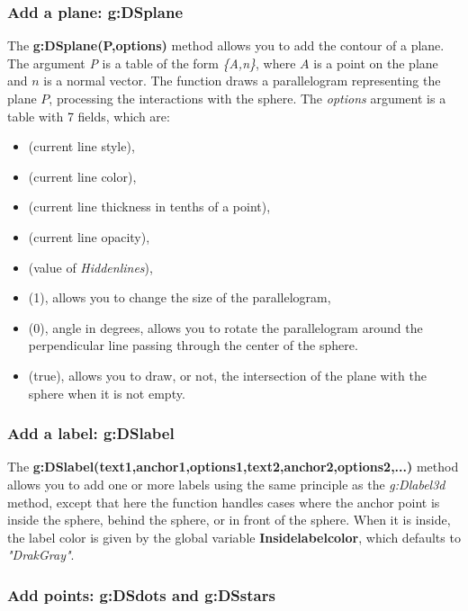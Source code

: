 \subsubsection{Add a plane: g:DSplane}

The \textbf{g:DSplane(P,options)} method allows you to add the contour of a plane. The argument \emph{P} is a table of the form \emph{\{A,n\}}, where $A$ is a point on the plane and $n$ is a normal vector. The function draws a parallelogram representing the plane $P$, processing the interactions with the sphere. The \emph{options} argument is a table with 7 fields, which are:
\begin{itemize}
    \item {} (current line style),
    \item {} (current line color),
    \item {} (current line thickness in tenths of a point),
    \item {} (current line opacity),
    \item {} (value of \emph{Hiddenlines}),
    \item {} (1), allows you to change the size of the parallelogram,
    \item {} (0), angle in degrees, allows you to rotate the parallelogram around the perpendicular line passing through the center of the sphere.
    \item {} (true), allows you to draw, or not, the intersection of the plane with the sphere when it is not empty. \end{itemize}

\subsubsection{Add a label: g:DSlabel}

The \textbf{g:DSlabel(text1,anchor1,options1,text2,anchor2,options2,...)} method allows you to add one or more labels using the same principle as the \emph{g:Dlabel3d} method, except that here the function handles cases where the anchor point is inside the sphere, behind the sphere, or in front of the sphere. When it is inside, the label color is given by the global variable \textbf{Insidelabelcolor}, which defaults to \emph{"DrakGray"}.

\subsubsection{Add points: g:DSdots and g:DSstars}

